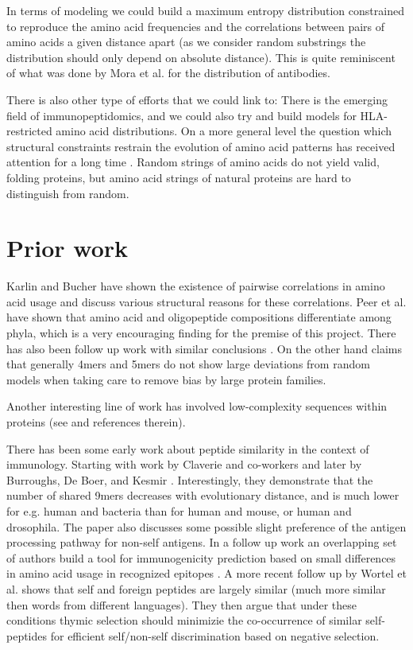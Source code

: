 \documentclass[superscriptaddress,twocolumn,pre]{revtex4}
\newcommand{\<}{\langle}
\renewcommand{\>}{\rangle}
\begin{document}
In terms of modeling we could build a maximum entropy distribution constrained to reproduce the amino acid frequencies and the correlations between pairs of amino acids a given distance apart (as we consider random substrings the distribution should only depend on absolute distance). This is quite reminiscent of what was done by Mora et al. \cite{Mora2010} for the distribution of antibodies.

There is also other type of efforts that we could link to: There is the emerging field of immunopeptidomics, and we could also try and build models for HLA-restricted amino acid distributions.
On a more general level the question which structural constraints restrain the evolution of amino acid patterns has received attention for a long time \cite{Turjanski2018}. Random strings of amino acids do not yield valid, folding proteins, but amino acid strings of natural proteins are hard to distinguish from random.


\section{Prior work}

Karlin and Bucher \cite{Karlin1992} have shown the existence of pairwise correlations in amino acid usage and discuss various structural reasons for these correlations. Peer et al. \cite{Peer2004} have shown that amino acid and oligopeptide compositions differentiate among phyla, which is a very encouraging finding for the premise of this project. There has also been follow up work with similar conclusions \cite{Bogatyreva2006}. On the other hand \cite{Lavelle2009} claims that generally 4mers and 5mers do not show large deviations from random models when taking care to remove bias by large protein families.

Another interesting line of work has involved low-complexity sequences within proteins (see \cite{Cascarina2018} and references therein).

There has been some early work about peptide similarity in the context of immunology. Starting with work by Claverie and co-workers%
and later by Burroughs, De Boer, and Kesmir \cite{Burroughs2004}. Interestingly, they demonstrate that the number of shared 9mers decreases with evolutionary distance, and is much lower for e.g. human and bacteria than for human and mouse, or human and drosophila. The paper also discusses some possible slight preference of the antigen processing pathway for non-self antigens. In a follow up work an overlapping set of authors build a tool for immunogenicity prediction based on small differences in amino acid usage in recognized epitopes \cite{Calis2013}. A more recent follow up by Wortel et al. \cite{Wortel2018} shows that self and foreign peptides are largely similar (much more similar then words from different languages). They then argue that under these conditions thymic selection should minimizie the co-occurrence of similar self-peptides for efficient self/non-self discrimination based on negative selection. 
\end{document}
